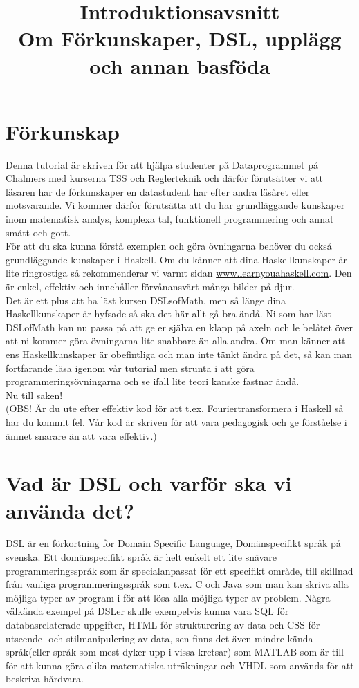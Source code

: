 \documentclass{article}
\title{Introduktionsavsnitt\\ 
\large Om Förkunskaper, DSL, upplägg och annan basföda}
\author{}
\date{}
\begin{document}
\maketitle

\section{Förkunskap}

Denna tutorial är skriven för att hjälpa studenter på Dataprogrammet på Chalmers med kurserna TSS och Reglerteknik och därför förutsätter vi att läsaren har de förkunskaper en datastudent har efter andra läsåret eller motsvarande. Vi kommer därför förutsätta att du har grundläggande kunskaper inom matematisk analys, komplexa tal, funktionell programmering och annat smått och gott. \\

För att du ska kunna förstå exemplen och göra övningarna behöver du också grundläggande kunskaper i Haskell. Om du känner att dina Haskellkunskaper är lite ringrostiga så rekommenderar vi varmt sidan \url{www.learnyouahaskell.com}. Den är enkel, effektiv och innehåller förvånansvärt många bilder på djur. \\

Det är ett plus att ha läst kursen DSLsofMath, men så länge dina Haskellkunskaper är hyfsade så ska det här allt gå bra ändå. Ni som har läst DSLofMath kan nu passa på att ge er själva en klapp på axeln och le belåtet över att ni kommer göra övningarna lite snabbare än alla andra. Om man känner att ens Haskellkunskaper är obefintliga och man inte tänkt ändra på det, så kan man fortfarande läsa igenom vår tutorial men strunta i att göra programmeringsövningarna och se ifall lite teori kanske fastnar ändå.\\


Nu till saken!\\

(OBS! Är du ute efter effektiv kod för att t.ex. Fouriertransformera i Haskell så har du kommit fel. Vår kod är skriven för att vara pedagogisk och ge förståelse i ämnet snarare än att vara effektiv.)

\section{Vad är DSL och varför ska vi använda det?}

DSL är en förkortning för Domain Specific Language, Domänspecifikt språk på svenska. Ett domänspecifikt språk är helt enkelt ett lite snävare programmeringsspråk som är specialanpassat för ett specifikt område, till skillnad från vanliga programmeringsspråk som t.ex. C och Java som man kan skriva alla möjliga typer av program i för att lösa alla möjliga typer av problem. Några välkända exempel på DSLer skulle exempelvis kunna vara SQL för databasrelaterade uppgifter, HTML för strukturering av data och CSS för utseende- och stilmanipulering av data, sen finns det även mindre kända språk(eller språk som mest dyker upp i vissa kretsar) som MATLAB som är till för att kunna göra olika matematiska uträkningar och VHDL som används för att beskriva hårdvara.\\
\end{document}
